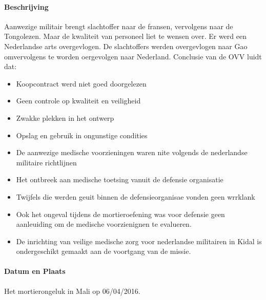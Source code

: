 \documentclass{article}
\begin{document}
	\paragraph{Beschrijving}
				Aanwezige militair brengt slachtoffer naar de fransen, vervolgens naar de Tongolezen. Maar de kwaliteit van personeel liet te wensen over.
			Er werd een Nederlandse arts overgevlogen. De slachtoffers werden overgevlogen naar Gao omvervolgens te worden oergevolgen naar Nederland.
			Conclusie van de OVV\cite{bnnvara13062018malirapport}
			\cite{eucal11012021malimissieverlengd}
			\cite{nos21052014zorgenmalimissie}
			\cite{meijnders}
			\cite{bnrwebredactie}
			\cite{keultjes01062016malimissiecoalitie}
			\cite{veenhof18012019}
			\cite{isitman06012016militair}
			\cite{nporadio11072016filmdemissie}
			\cite{parlementairmonitor15122013mortierongeluk} luidt dat:
			\begin{itemize}
				\item Koopcontract werd niet goed doorgelezen
				\item Geen controle op kwaliteit en veiligheid
				\item Zwakke plekken in het ontwerp
				\item Opslag en gebruik in ongunstige condities
				\item De aanwezige medische voorzieningen waren nite volgends de nederlandse militaire richtlijnen
				\item Het ontbreek aan medische toetsing vanuit de defensie organisatie
				\item Twijfels die werden geuit binnen de defensieorganisae vonden geen wrrklank
				\item Ook het ongeval tijdens de mortieroefening was voor defensie geen aanleuiding om de medische voorzienignen te evalueren.
				\item De inrichting van veilige medische zorg voor nederlandse militairen in Kidal is ondergeschikt gemaakt aan de voortgang van de missie.
			\end{itemize}
	\paragraph{Datum en Plaats}
 
	\newline \indent Het mortierongeluk in Mali op 06/04/2016. 
\end{document}
